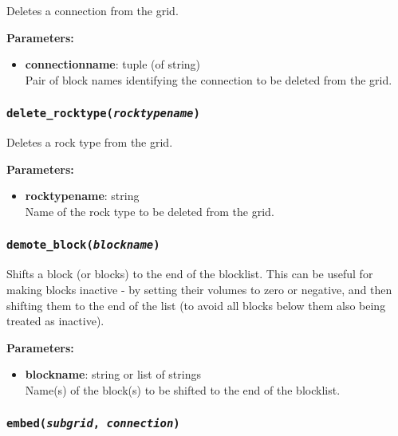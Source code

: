 Deletes a connection from the grid.

\textbf{Parameters:}
\begin{itemize}
\item \textbf{connectionname}: tuple (of string)\\
  Pair of block names identifying the connection to be deleted from the grid.
\end{itemize}

\begin{snugshade}
\subsubsection{\texttt{delete\_rocktype(\emph{rocktypename})}}
\end{snugshade}
\label{sec:t2grid:delete_rocktype}

Deletes a rock type from the grid.

\textbf{Parameters:}
\begin{itemize}
\item \textbf{rocktypename}: string\\
  Name of the rock type to be deleted from the grid.
\end{itemize}

\begin{snugshade}
\subsubsection{\texttt{demote\_block(\emph{blockname})}}
\end{snugshade}
\label{sec:t2grid:demote_block}

Shifts a block (or blocks) to the end of the blocklist.  This can be useful for making blocks inactive - by setting their volumes to zero or negative, and then shifting them to the end of the list (to avoid all blocks below them also being treated as inactive).

\textbf{Parameters:}
\begin{itemize}
\item \textbf{blockname}: string or list of strings\\
  Name(s) of the block(s) to be shifted to the end of the blocklist.
\end{itemize}

\begin{snugshade}
\subsubsection{\texttt{embed(\emph{subgrid}, \emph{connection})}}
\end{snugshade}
\label{sec:t2grid:embed}

